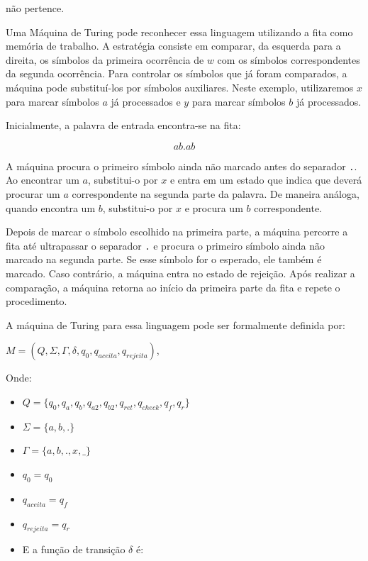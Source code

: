 \documentclass[
  brazilian,
  letterpaper,
]{book}
\providecommand{\tightlist}{%
  \setlength{\itemsep}{0pt}\setlength{\parskip}{0pt}}
\theoremstyle{plain}
\theoremstyle{definition}
\theoremstyle{remark}
\begin{document}
não pertence.

Uma Máquina de Turing pode reconhecer essa linguagem utilizando a fita
como memória de trabalho. A estratégia consiste em comparar, da esquerda
para a direita, os símbolos da primeira ocorrência de \(w\) com os
símbolos correspondentes da segunda ocorrência. Para controlar os
símbolos que já foram comparados, a máquina pode substituí-los por
símbolos auxiliares. Neste exemplo, utilizaremos \(x\) para marcar
símbolos \(a\) já processados e \(y\) para marcar símbolos \(b\) já
processados.

Inicialmente, a palavra de entrada encontra-se na fita:

\[
ab.ab
\]

A máquina procura o primeiro símbolo ainda não marcado antes do
separador \texttt{.}. Ao encontrar um \(a\), substitui-o por \(x\) e
entra em um estado que indica que deverá procurar um \(a\)
correspondente na segunda parte da palavra. De maneira análoga, quando
encontra um \(b\), substitui-o por \(x\) e procura um \(b\)
correspondente.

Depois de marcar o símbolo escolhido na primeira parte, a máquina
percorre a fita até ultrapassar o separador \texttt{.} e procura o
primeiro símbolo ainda não marcado na segunda parte. Se esse símbolo for
o esperado, ele também é marcado. Caso contrário, a máquina entra no
estado de rejeição. Após realizar a comparação, a máquina retorna ao
início da primeira parte da fita e repete o procedimento.

A máquina de Turing para essa linguagem pode ser formalmente definida
por:

\(M=(Q,\Sigma,\Gamma,\delta,q_0,q_{aceita},q_{rejeita})\),

Onde:

\begin{itemize}
\tightlist
\item
  \(Q = \{q_0, q_a, q_b, q_{a2}, q_{b2}, q_{ret}, q_{check}, q_f, q_r\}\)
\item
  \(\Sigma = \{a,b,.\}\)
\item
  \(\Gamma = \{a,b,.,x,\_\}\)
\item
  \(q_0 = q_0\)
\item
  \(q_{aceita} = q_f\)
\item
  \(q_{rejeita} = q_r\)
\item
  E a função de transição \(\delta\) é:
\end{itemize}
\end{document}
